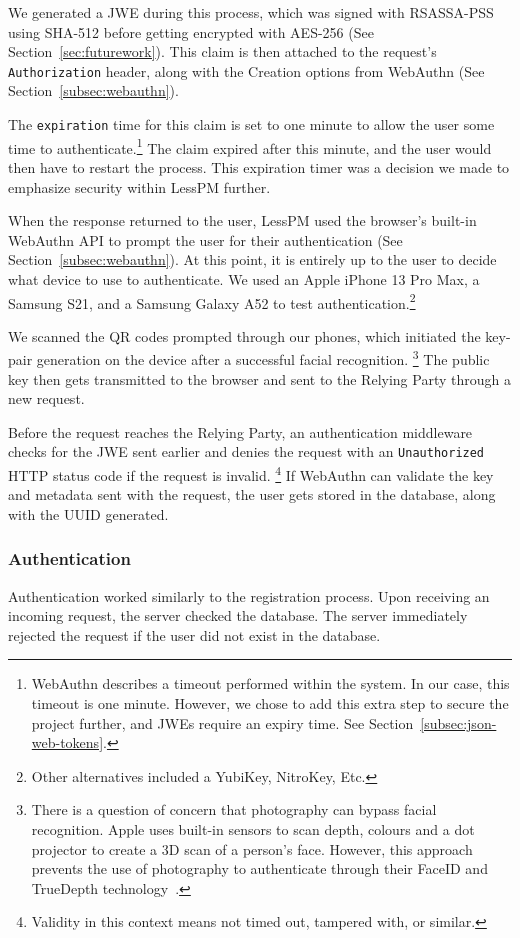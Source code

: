 We generated a JWE during this process, which was signed with RSASSA-PSS using
SHA-512 before getting encrypted with AES-256
(See Section~\ref{sec:futurework}).
This claim is then attached to the request's \texttt{Authorization} header,
along with the Creation options from WebAuthn
(See Section~\ref{subsec:webauthn}).

The \texttt{expiration} time for this claim is set to one minute to allow the
user some time to authenticate.\footnote{
  WebAuthn describes a timeout performed within the system. In our case, this
  timeout is one minute.
  However, we chose to add this extra step to secure the project further, and JWEs require an expiry time. See Section~\ref{subsec:json-web-tokens}.
}
The claim expired after this minute, and the user would then have to restart the
process.
This expiration timer was a decision we made to emphasize security within LessPM
further.

When the response returned to the user, LessPM used the browser's built-in
WebAuthn API to prompt the user for their authentication
(See Section~\ref{subsec:webauthn}).
At this point, it is entirely up to the user to decide what device to use to
authenticate.
We used an Apple iPhone 13 Pro Max, a Samsung S21, and a Samsung Galaxy A52 to
test authentication.\footnote{
  Other alternatives included a YubiKey, NitroKey, Etc.
}

We scanned the QR codes prompted through our phones, which initiated the
key-pair generation on the device after a successful facial recognition.
\footnote{
  There is a question of concern that photography can bypass facial recognition.
  Apple uses built-in sensors to scan depth, colours and a dot projector to
  create a 3D scan of a person's face.
  However, this approach prevents the use of photography to authenticate through
  their FaceID and TrueDepth technology~\cite{apple-support}.
}
The public key then gets transmitted to the browser and sent to the Relying
Party through a new request.

Before the request reaches the Relying Party, an authentication middleware
checks for the JWE sent earlier and denies the request with an
\texttt{Unauthorized} HTTP status code if the request is invalid.
\footnote{
  Validity in this context means not timed out, tampered with, or similar.
}
If WebAuthn can validate the key and metadata sent with the request, the user
gets stored in the database, along with the UUID generated.

\subsubsection{Authentication}\label{subsubsec:metho-authentication}
Authentication worked similarly to the registration process.
Upon receiving an incoming request, the server checked the database.
The server immediately rejected the request if the user did not exist in the
database.

